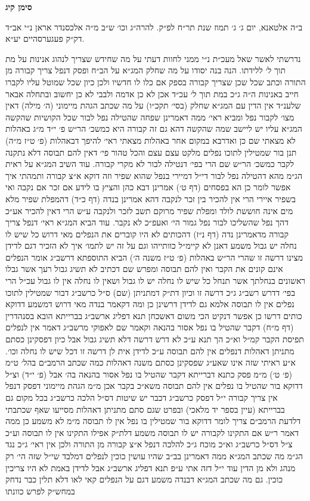 \documentclass[12pt, openany]{book}
\newcommand{\chapname}{}
\newcommand{\newchap}[1]{
	\addcontentsline{toc}{chapter}{#1}
	\renewcommand{\chapname}{#1}
		\begin{center}
			\textbf{%
\fontsize{16pt}{16pt}\selectfont
				#1}
		\end{center}
}
\begin{document}
\newchap{סימן קיג}
\begin{multicols}{2}
ב״ה אלטאנא, יום ג׳ ג׳ תמוז שנת תר״ח לפ״ק. להרה״ג וכו׳ ש״ב מ״ה אלכסנדר אראן נ״י אב״ד דק״ק פעגערסהיים יע״א.\\\vspace{0pt}

נדרשתי לאשר שאל מעכ״ת נ״י ממני לחוות דעתי על מה שחידש שצריך לנהוג אנינות על מת תוך ל׳ ללידתו. הנה בנה יסודו על מה שחלק המג״א על הב״ח ופסק דנפל צריך קבורה מן התורה וכתב שכל שכן שצריך קבורה בספק אם כלו לו חדשיו ולכן כיון שכל שמוטל עליו לקברו חייב באנינות ה״ה ג״כ במת תוך ל׳ עכ״ד אכן לא כן אדמה ולבבי לא כן יחשוב ובתחלה אבאר שלענ״ד אין הדין עם המג״א שחלק (בסי׳ תקכ״ו) על מה שכתב הגהת מיימוני (ה׳ מילה) דאין מצו׳ לקבור נפל ומביא ראי׳ ממה דאמרינן שפחה שהטילה נפל לבור שכל הקושיות שהקשה המג״א עליו יש ליישב שמה שהקשה דהא גם זה קבורה היא כמשכ׳ הר״ש פ׳ י״ד מ״ג באהלות לא מצאתי שם כן ואדרבא במקום אחר באהלות מצאתי ראי׳ להיפך דבאהלות (פ׳ ט״ז מ״ה) תנן בור שמטילין לתוכו נפלים מלקט עצם עצם והכל טהור פי׳ דאין להם תבוסה דלא נתקנה לקבר כמשכ׳ הר״ש שם הרי בפי׳ דנטילה לבור לא מקרי קבורה. עוד השיב המג״א על ראית הג״מ מהא דהטילה נפל לבור די״ל דמיירי בנפל שהוא שפיר וזה דוקא א״צ קבורה ותמהתי איך אפשר לומר כן הא בפסחים (דף ט׳) אמרינן דבא כהן והציץ בו לידע אם זכר אם נקבה ואי בשפיר איירי הרי אין להכיר בין זכר לנקבה דהא אמרינן בנדה (דף כ״ד) דהמפלת שפיר מלא מים אינה חוששת לולד ומפלת שפיר מרוקם תשב לזכר ולנקבה ע״ש הרי דאין להכיר אע״כ דהך נפל שהשליכו לבור נפל גמור הי׳ ואעפ״כ לא נקבר. עוד הביא המג״א ראי׳ דנפל צריך קבורה מדאמרינן נדה (דף נ״ז) דהכותים לא היו קוברים את הנפלים מאי דרוש כל שיש לו נחלה יש גבול משמע דאנן לא קיימ״ל כוותייהו וגם על זה יש לתמו׳ איך לא הזכיר דגם לדידן מצינו דרשה זו שהרי הר״ש באהלות (פ׳ ט״ז משנה ה׳) הביא התוספתא דרשב״ג אומר הנפלים אינם קונים את הקבר ואין להם תבוסה ומפרש שם דכתיב לא תשיג גבול רעך אשר גבלו ראשונים בנחלתך אשר תנחל כל שיש לו נחלה יש לו גבול ושאין לו נחלה אין לו גבול עכ״ל הרי בפי׳ דדרש רשב״ג ג״כ דרשה זו וכיון דת״ק דמתניתן (שם) ס״ל כרשב״ג דבור שמטילין לתוכו נפלים אין לו תבוסה אלמא גם לדידן דרשינן כן ומה דקאמר בנדה מאי דרוש דמשמע דדוקא כותים דרשו כן אפשר דנקיט הכי משום דאשכחן תנא דפליג ארשב״ג בברייתא הובא בסנהדרין (דף מ״ח) דקבר שהטיל בו נפל אסור בהנאה וקאמר שם לאפוקי מרשב״ג דאמר אין לנפלים תפיסת הקבר קמ״ל וא״כ הך תנא ע״כ לא דרש דרשה דלא תשיג גבול אבל כיון דפסקינן כסתם מתניתן דאהלות דנפלים אין להם תבוסה ע״כ לדידן אית לן דרשה זו דכל שיש לו נחלה וכו׳. א״ע ראיתי שזה אינו שאע״ג שפסקינן כסתם משנה דאהלות כמה שכתב הרמב״ם בהל׳ ט״מ (פ׳ ט׳) מ״מ פסק כתנא דברייתא דקבר שהטיל בו נפל אסור בהנאה בה׳ אבל (פ׳ י״ד) וצ״ל דדוקא בור שהטיל בו נפלים אין להם תבוסה משא״כ בקבר אכן מ״מ הגהת מיימוני דפסק דנפל אין צריך קבורה י״ל דפסק כרשב״ג דכבר יש שיטות דס״ל הלכה כרשב״ג בכל מקום גם בברייתא (עיין בספר יד מלאכי) ובפרט שגם סתם מתניתן דאהלות מסייעו שאף שכתבתי דלדעת הרמב״ם צריך לומר דדוקא בור שמטילין בו נפל אין לו תבוסה מ״מ לא משמע כן ממה דאמר ר״ש אם התקינו לקבורה יש לו תבוסה משמע דלת״ק אפילו התקינו אין לו תבוסה וע״כ צ״ל דס״ל כרשב״ג וא״כ מוכח ג״כ להלכה דנפל א״צ קבורה מן התורה ולכן אין ראי׳ ג״כ נגד הג״מ מה שכתב המג״א ממה דאמרינן בב״ב שהיו עושין כוכין לנפלים דמלבד שי״ל שזה הי׳ רק מנהג ולא מן הדין עוד י״ל דזה אתי ע״פ תנא דפליג ארשב״ג אבל לדידן באמת לא היו צריכין כוכין. גם מה שכתב המג״א דבנדה משמע דגם על הנפלים קאי לאו דלא תלין כבר נדחק במחש״ק לפרש כוונתו 
\end{multicols}
\end{document}
